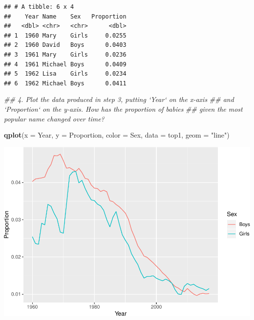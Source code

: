 \documentclass[]{book}
\newenvironment{Shaded}{\begin{snugshade}}{\end{snugshade}}
\newcommand{\CommentTok}[1]{\textcolor[rgb]{0.56,0.35,0.01}{\textit{#1}}}
\newcommand{\DataTypeTok}[1]{\textcolor[rgb]{0.13,0.29,0.53}{#1}}
\newcommand{\DecValTok}[1]{\textcolor[rgb]{0.00,0.00,0.81}{#1}}
\newcommand{\KeywordTok}[1]{\textcolor[rgb]{0.13,0.29,0.53}{\textbf{#1}}}
\newcommand{\NormalTok}[1]{#1}
\newcommand{\OperatorTok}[1]{\textcolor[rgb]{0.81,0.36,0.00}{\textbf{#1}}}
\newcommand{\StringTok}[1]{\textcolor[rgb]{0.31,0.60,0.02}{#1}}
\begin{document}
\begin{Shaded}
\end{Shaded}

\begin{verbatim}
## # A tibble: 6 x 4
##    Year Name    Sex   Proportion
##   <dbl> <chr>   <chr>      <dbl>
## 1  1960 Mary    Girls     0.0255
## 2  1960 David   Boys      0.0403
## 3  1961 Mary    Girls     0.0236
## 4  1961 Michael Boys      0.0409
## 5  1962 Lisa    Girls     0.0234
## 6  1962 Michael Boys      0.0411
\end{verbatim}

\begin{Shaded}
\begin{Highlighting}[]
\CommentTok{## 4. Plot the data produced in step 3, putting `Year` on the x-axis}
\CommentTok{##    and `Proportion` on the y-axis. How has the proportion of babies}
\CommentTok{##    given the most popular name changed over time?}
\end{Highlighting}
\end{Shaded}

\begin{Shaded}
\begin{Highlighting}[]
\KeywordTok{qplot}\NormalTok{(}\DataTypeTok{x =}\NormalTok{ Year, }
      \DataTypeTok{y =}\NormalTok{ Proportion, }
      \DataTypeTok{color =}\NormalTok{ Sex, }
      \DataTypeTok{data =}\NormalTok{ top1, }
      \DataTypeTok{geom =} \StringTok{"line"}\NormalTok{)}
\end{Highlighting}
\end{Shaded}

\includegraphics{R/Rintro/figures/unnamed-chunk-82-1.pdf}
\end{document}
